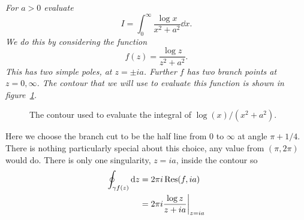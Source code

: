 \documentclass{article}
\begin{document}
    \begin{example}
        \itshape
        For \(a > 0\) evaluate
        \[I = \int_{0}^{\infty} \frac{\log x}{x^2 + a^2} \dd{x}.\]
        \normalfont
        We do this by considering the function
        \[f(z) = \frac{\log z}{z^2 + a^2}.\]
        This has two simple poles, at \(z = \pm ia\).
        Further \(f\) has two branch points at \(z = 0, \infty\).
        The contour that we will use to evaluate this function is shown in figure~\ref{fig:contour for log x/x^2 + a^2}.
        \begin{figure}[ht]
            \centering
            \tikzexternalenable
            \tikzexternaldisable
            \caption{The contour used to evaluate the integral of \(\log(x)/(x^2 + a^2)\).}
            \label{fig:contour for log x/x^2 + a^2}
        \end{figure}
        Here we choose the branch cut to be the half line from \(0\) to \(\infty\) at angle \(\pi + 1/4\).
        There is nothing particularly special about this choice, any value from \((\pi, 2\pi)\) would do.
        There is only one singularity, \(z = ia\), inside the contour so
        \begin{align*}
            \oint_{\gamma f(z)}\dd{z} &= 2\pi i\Res(f, ia)\\
            &= 2\pi i \frac{\log z}{z + ia} \bigg|_{z=ia}\\

\end{align*}
\end{example}
\end{document}
